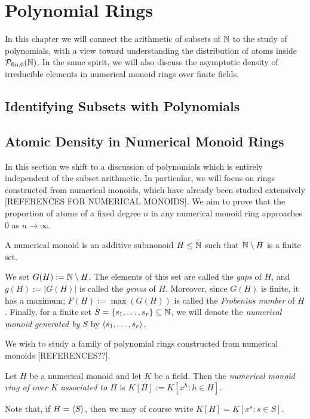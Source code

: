 \chapter{Polynomial Rings}

In this chapter we will connect the arithmetic of subsets of $\mathbb{N}$ to the study of polynomials, with a view toward understanding the distribution of atoms inside ${\mathcal{P}_{\textrm{fin},0}(\mathbb{N})}$.
In the same spirit, we will also discuss the asymptotic density of irreducible elements in numerical monoid rings over finite fields.

\section{Identifying Subsets with Polynomials}




\section{Atomic Density in Numerical Monoid Rings}

In this section we shift to a discussion of polynomials which is entirely independent of the subset arithmetic.
In particular, we will focus on rings constructed from numerical monoids, which have already been studied extensively [REFERENCES FOR NUMERICAL MONOIDS].  
We aim to prove that the proportion of atoms of a fixed degree $n$ in any numerical monoid ring approaches $0$ as $n\to\infty$.

\begin{defn}
A numerical monoid is an additive submonoid $H \le \mathbb{N}$ such that $\mathbb{N}\setminus H$ is a finite set.  

We set $G(H) := \mathbb{N} \setminus H$. 
The elements of this set are called the \textit{gaps} of $H$, and $g(H) := |G(H)|$ is called the \textit{genus} of $H$.
Moreover, since $G(H)$ is finite, it has a maximum; $F(H) := \max(G(H))$ is called the \textit{Frobenius number} of $H$.
Finally, for a finite set $S = \{s_1,\dots, s_r\}\subseteq \mathbb{N}$, we will denote the \textit{numerical monoid generated by $S$} by $\langle s_1,\dots,s_r \rangle$.
\end{defn}


We wish to study a family of polynomial rings constructed from numerical monoids [REFERENCES??].

\begin{defn}
Let $H$ be a numerical monoid and let $K$ be a field.
Then the \textit{numerical monoid ring of over $K$ associated to $H$} is $K[H] := K[x^h : h\in H]$.

Note that, if $H = \langle S \rangle$, then we may of course write $K[H] = K[x^s: s\in S]$.
\end{defn}


